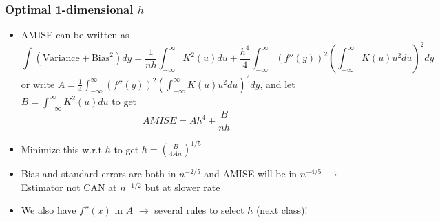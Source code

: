\documentclass[aspectratio=169]{beamer}
\begin{document}
\begin{frame}
\frametitle{Optimal 1-dimensional $h$}
\begin{itemize}
\item AMISE can be written as 
 \[
 \int(\text{Variance}+\text{Bias}^2)dy=\frac{1}{nh}\int_{-\infty}^\infty K^2(u)du+\frac{h^4}{4}\int_{-\infty}^\infty(f''(y))^2\left(\int_{-\infty}^\infty K(u)u^2du\right)^2 dy
 \]
 or write  $A=\frac{1}{4}\int_{-\infty}^\infty(f''(y))^2\left(\int_{-\infty}^\infty K(u)u^2du\right)^2 dy$, and let $B=\int_{-\infty}^\infty K^2(u)du$ to get
 \[
 AMISE =Ah^4+\frac{B}{nh}
 \]
\item Minimize this w.r.t $h$ to get  $h=\left(\frac{B}{4An}\right)^{1/5}$
\item Bias and standard errors are both in $n^{-2/5}$ and AMISE will be in $n^{-4/5}$ $\to$ Estimator not CAN at $n^{-1/2}$ but at slower rate
\item We also have $f''(x)$ in $A$ $\to$ several rules to select $h$ (next class)! 
\end{itemize}
\end{frame}
\end{document}

